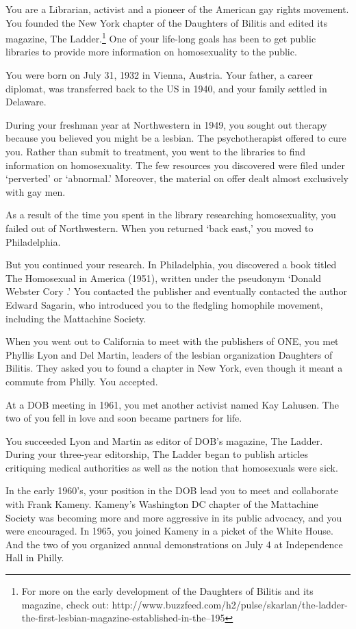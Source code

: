 \begin{refsection}
You are a Librarian, activist and a pioneer of the American gay rights movement. You founded the New York chapter of the Daughters of Bilitis and edited its magazine, The Ladder.\footnote{For more on the early development of the Daughters of Bilitis and its magazine, check out: http:\slash \slash www.buzzfeed.com\slash h2\slash pulse\slash skarlan\slash the-ladder-the-first-lesbian-magazine-established-in-the--195} One of your life-long goals has been to get public libraries to provide more information on homosexuality to the public.

You were born on July 31, 1932 in Vienna, Austria. Your father, a career diplomat, was transferred back to the US in 1940, and your family settled in Delaware.

During your freshman year at Northwestern in 1949, you sought out therapy because you believed you might be a lesbian. The psychotherapist offered to cure you. Rather than submit to treatment, you went to the libraries to find information on homosexuality. The few resources you discovered were filed under `perverted' or `abnormal.' Moreover, the material on offer dealt almost exclusively with gay men.

As a result of the time you spent in the library researching homosexuality, you failed out of Northwestern. When you returned `back east,' you moved to Philadelphia.

But you continued your research. In Philadelphia, you discovered a book titled The Homosexual in America (1951), written under the pseudonym `Donald Webster Cory .' You contacted the publisher and eventually contacted the author Edward Sagarin, who introduced you to the fledgling homophile movement, including the Mattachine Society.

When you went out to California to meet with the publishers of ONE, you met Phyllis Lyon and Del Martin, leaders of the lesbian organization Daughters of Bilitis. They asked you to found a chapter in New York, even though it meant a commute from Philly. You accepted. 

At a DOB meeting in 1961, you met another activist named Kay Lahusen. The two of you fell in love and soon became partners for life.

You succeeded Lyon and Martin as editor of DOB's magazine, The Ladder. During your three-year editorship, The Ladder began to publish articles critiquing medical authorities as well as the notion that homosexuals were sick.

In the early 1960's, your position in the DOB lead you to meet and collaborate with Frank Kameny. Kameny's Washington DC chapter of the Mattachine Society was becoming more and more aggressive in its public advocacy, and you were encouraged. In 1965, you joined Kameny in a picket of the White House. And the two of you organized annual demonstrations on July 4 at Independence Hall in Philly.


\end{refsection}
